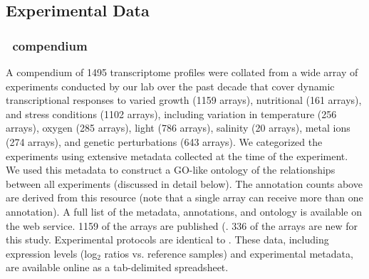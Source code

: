\subsection{Experimental Data}

\subsubsection{\halo~compendium}\label{halodata}

A compendium of 1495 transcriptome profiles were collated from a wide array of experiments conducted by our lab over the past decade that cover dynamic transcriptional responses to varied growth (1159 arrays), nutritional (161 arrays), and stress conditions (1102 arrays), including variation in temperature (256 arrays), oxygen (285 arrays), light (786 arrays), salinity (20 arrays), metal ions (274 arrays), and genetic perturbations (643 arrays).  We categorized the experiments using extensive metadata collected at the time of the experiment. We used this metadata to construct a GO-like ontology of the relationships between all experiments (discussed in detail below). The annotation counts above are derived from this resource (note that a single array can receive more than one annotation).  A full list of the metadata, annotations, and ontology is available on the web service.  1159 of the arrays are published (\cite{baliga_genome_2004,baliga_coordinate_2002,bonneau_predictive_2007,facciotti_large_2010,facciotti_general_2007,kaur_systems_2006,kaur_coordination_2010,schmid_two_2011,schmid_anatomy_2007,schmid_single_2009,whitehead_integrated_2006,whitehead_diurnally_2009}. 336 of the arrays are new for this study. Experimental protocols are identical to \cite{bonneau_predictive_2007}. These data, including expression levels (log$_2$ ratios vs. reference samples) and experimental metadata, are available online as a tab-delimited spreadsheet.

